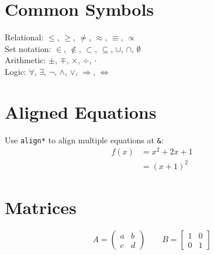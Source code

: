 \documentclass[11pt]{article}
\begin{document}
\section{Common Symbols}

Relational: $\leq$, $\geq$, $\neq$, $\approx$, $\equiv$, $\propto$ \\
Set notation: $\in$, $\notin$, $\subset$, $\subseteq$, $\cup$, $\cap$, $\emptyset$ \\
Arithmetic: $\pm$, $\mp$, $\times$, $\div$, $\cdot$ \\
Logic: $\forall$, $\exists$, $\neg$, $\land$, $\lor$, $\Rightarrow$, $\Leftrightarrow$

\section{Aligned Equations}

Use \texttt{align*} to align multiple equations at \texttt{\&}:
\begin{align*}
    f(x)  &= x^2 + 2x + 1 \\
          &= (x + 1)^2
\end{align*}

\section{Matrices}

\begin{equation*}
    A = \begin{pmatrix} a & b \\ c & d \end{pmatrix}
    \qquad
    B = \begin{bmatrix} 1 & 0 \\ 0 & 1 \end{bmatrix}
\end{equation*}
\end{document}
